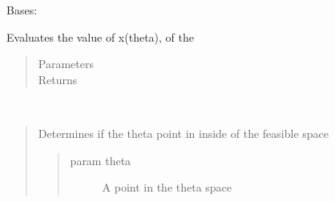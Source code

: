 \documentclass[letterpaper,10pt,english]{sphinxmanual}
\begin{document}
\begin{fulllineitems}
\label{\detokenize{ppopt.upop:ppopt.upop.point_location.PointLocation}}
\sphinxAtStartPar
Bases: 

\begin{fulllineitems}
\label{\detokenize{ppopt.upop:ppopt.upop.point_location.PointLocation.evaluate}}
\sphinxAtStartPar
Evaluates the value of x(theta), of the
\begin{quote}\begin{description}
\item[{Parameters}] \leavevmode
\sphinxAtStartPar
{} \textendash{} 

\item[{Returns}] \leavevmode
\sphinxAtStartPar


\end{description}\end{quote}

\end{fulllineitems}


\begin{fulllineitems}
\label{\detokenize{ppopt.upop:ppopt.upop.point_location.PointLocation.is_inside}}~\begin{quote}

\sphinxAtStartPar
Determines if the theta point in inside of the feasible space
\begin{quote}\begin{description}
\item[{param theta}] \leavevmode
\sphinxAtStartPar
A point in the theta space


\end{description}
\end{quote}
\end{quote}
\end{fulllineitems}
\end{fulllineitems}
\end{document}
